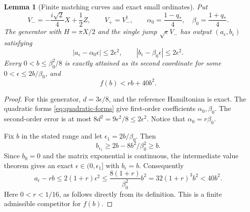 \documentclass[11pt]{article}
\newtheorem{lemma}[theorem]{Lemma}
\theoremstyle{definition}
\theoremstyle{remark}
\begin{document}
\begin{lemma}[Finite matching curves and exact small ordinates]\label{lem:matching}
Put
\begin{equation}\label{eq:matching-jumps}
 V_-=-\frac{i\sqrt2}{4}X+\frac12Z,\qquad V_+=V_-^\dagger,
 \qquad \alpha_0=\frac{1-q_*}{4},\quad \beta_0=\frac{1+q_*}{4}.
\end{equation}
The generator with \(H=\pi X/2\) and the single jump \(\sqrt\epsilon V_-\) has output \((a_\epsilon,b_\epsilon)\) satisfying
\begin{equation}\label{eq:matching-errors}
 |a_\epsilon-\alpha_0\epsilon|\leq2\epsilon^2,
 \qquad |b_\epsilon-\beta_0\epsilon|\leq2\epsilon^2.
\end{equation}
Every \(0<b\leq\beta_0^2/8\) is exactly attained as its second coordinate for some \(0<\epsilon\leq2b/\beta_0\), and
\begin{equation}\label{eq:matching-upper}
 f(b)<rb+40b^2.
\end{equation}
\end{lemma}
\begin{proof}
For this generator, \(d=3\epsilon/8\), and the reference Hamiltonian is exact. The quadratic forms \eqref{eq:quadratic-forms} give first-order coefficients \(\alpha_0,\beta_0\). The second-order error is at most \(8d^2=9\epsilon^2/8\leq2\epsilon^2\). Notice that \(\alpha_0=r\beta_0\).

Fix \(b\) in the stated range and let \(\epsilon_1=2b/\beta_0\). Then
\[
 b_{\epsilon_1}\geq2b-8b^2/\beta_0^2\geq b.
\]
Since \(b_0=0\) and the matrix exponential is continuous, the intermediate value theorem gives an exact \(\epsilon\in(0,\epsilon_1]\) with \(b_\epsilon=b\). Consequently
\[
 a_\epsilon-rb\leq2(1+r)\epsilon^2
 \leq\frac{8(1+r)}{\beta_0^2}b^2
 =32(1+r)^3b^2<40b^2.
\]
Here \(0<r<1/16\), as follows directly from its definition. This is a finite admissible competitor for \(f(b)\).
\end{proof}
\end{document}
